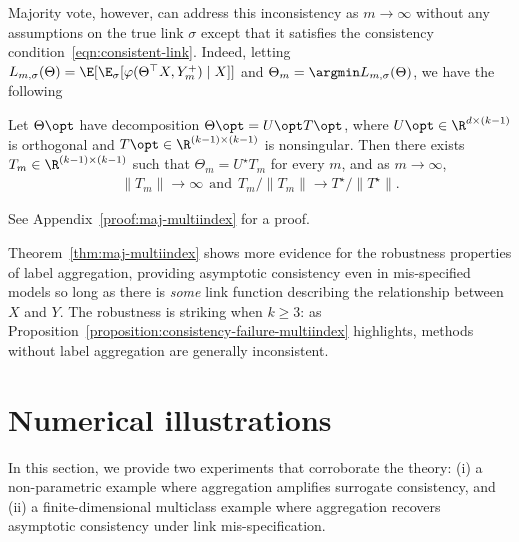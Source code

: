 \documentclass[11pt]{article}
\newcommand{\sloss}{\varphi}  %
\begin{document}
Majority vote, however, can address this inconsistency as $m \to \infty$
without any assumptions on the true link $\sigma$ except that it satisfies
the consistency condition~\eqref{eqn:consistent-link}.
%
Indeed, letting $L_{m,\sigma}(\Theta) = \E[\E_\sigma[\sloss(\Theta^\top X,
    Y_m^+) \mid X]]$ and $\Theta_m = \argmin L_{m,\sigma}(\Theta)$, we have
the following
\begin{theorem}
  \label{thm:maj-multiindex}
  Let $\Theta\opt$ have decomposition $\Theta\opt = U\opt T\opt$, where $U\opt
  \in \R^{d \times (k-1)}$ is orthogonal and $T\opt \in \R^{(k-1) \times
    (k-1)}$ is nonsingular.
  Then there exists $T_m \in \R^{(k-1) \times (k-1)}$ such that $\Theta_m =
  U^\star T_m$ for every $m$, and as $m \to \infty$,
  \begin{align*}
    \|T_m\| \to \infty
    ~~ \mbox{and} ~~ T_m / \|T_m\| \to T^\star / \|T^\star\|.
  \end{align*}
\end{theorem}
\noindent
See Appendix~\ref{proof:maj-multiindex} for a proof.

Theorem~\ref{thm:maj-multiindex} shows more evidence for the robustness
properties of label aggregation, providing asymptotic consistency even in
mis-specified models so long as there is \emph{some} link function
describing the relationship between $X$ and $Y$.
%
The robustness is striking when $k \geq 3$: as
Proposition~\ref{proposition:consistency-failure-multiindex} highlights,
methods without label aggregation are generally inconsistent.



\section{Numerical illustrations}
In this section, we provide two experiments that corroborate the theory: (i) a non-parametric example where aggregation amplifies surrogate consistency, and (ii) a finite-dimensional multiclass example where aggregation recovers asymptotic consistency under link mis-specification.
\end{document}
